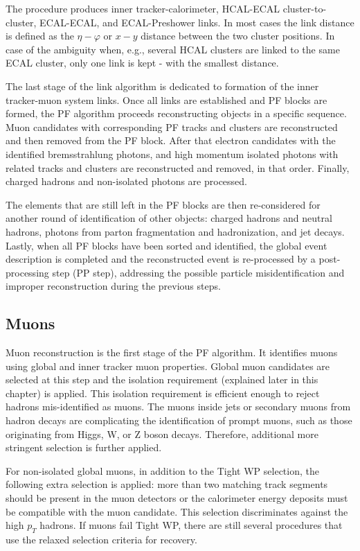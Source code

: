 The procedure produces inner tracker-calorimeter, HCAL-ECAL cluster-to-cluster, ECAL-ECAL, and ECAL-Preshower links. In most cases the link distance is defined as the $\eta-\varphi$ or $x-y$ distance between the two cluster positions. In case of the ambiguity when, e.g., several HCAL clusters are linked to the same ECAL cluster, only one link is kept - with the smallest distance. 

The last stage of the link algorithm is dedicated to formation of the inner tracker-muon system links. Once all links are established and PF blocks are formed, the PF algorithm proceeds reconstructing objects in a specific sequence. Muon candidates with corresponding PF tracks and clusters are reconstructed and then removed from the PF block. After that electron candidates with the identified bremsstrahlung photons, and high momentum isolated photons with related tracks and clusters are reconstructed and removed, in that order. Finally, charged hadrons and non-isolated photons are processed.

The elements that are still left in the PF blocks are then re-considered for another round of identification of other objects: charged hadrons and neutral hadrons, photons from parton fragmentation and hadronization, and jet decays. Lastly, when all PF blocks have been sorted and identified, the global event description is completed and the reconstructed event is re-processed by a post-processing step (PP step), addressing the possible particle misidentification and improper reconstruction during the previous steps. 

\subsection{Muons}\label{sec:muons}

Muon reconstruction is the first stage of the PF algorithm. It identifies muons using global and inner tracker muon properties. Global muon candidates are selected at this step and the isolation requirement (explained later in this chapter) is applied. This isolation requirement is efficient enough to reject hadrons mis-identified as muons. The muons inside jets or secondary muons from hadron decays are complicating the identification of prompt muons, such as those originating from Higgs, W, or Z boson decays. Therefore, additional more stringent selection is further applied. 

For non-isolated global muons, in addition to the Tight WP selection, the following extra selection is applied: more than two matching track segments should be present in the muon detectors or the calorimeter energy deposits must be compatible with the muon candidate. This selection discriminates against the high $p_T$ hadrons. If muons fail Tight WP, there are still several procedures that use the relaxed selection criteria for recovery. 

